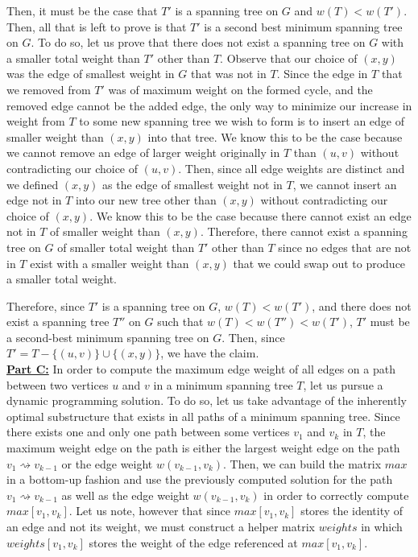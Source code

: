 \documentclass[11pt]{article}
\begin{document}
Then, it must be the case that $T'$ is a spanning tree on $G$ and $w(T) < w(T')$. Then, all that is left to prove is that $T'$ is a second best minimum spanning tree on $G$. To do so, let us prove that there does not exist a spanning tree on $G$ with a smaller total weight than $T'$ other than $T$. Observe that our choice of $(x,y)$ was the edge of smallest weight in $G$ that was not in $T$. Since the edge in $T$ that we removed from $T'$ was of maximum weight on the formed cycle, and the removed edge cannot be the added edge, the only way to minimize our increase in weight from $T$ to some new spanning tree we wish to form is to insert an edge of smaller weight than $(x,y)$ into that tree. We know this to be the case because we cannot remove an edge of larger weight originally in $T$ than $(u,v)$ without contradicting our choice of $(u,v)$. Then, since all edge weights are distinct and we defined $(x,y)$ as the edge of smallest weight not in $T$, we cannot insert an edge not in $T$ into our new tree other than $(x,y)$ without contradicting our choice of $(x,y)$. We know this to be the case because there cannot exist an edge not in $T$ of smaller weight than $(x,y)$. Therefore, there cannot exist a spanning tree on $G$ of smaller total weight than $T'$ other than $T$ since no edges that are not in $T$ exist with a smaller weight than $(x,y)$ that we could swap out to produce a smaller total weight.

Therefore, since $T'$ is a spanning tree on $G$, $w(T) < w(T')$, and there does not exist a spanning tree $T''$ on $G$ such that $w(T) < w(T'') < w(T')$, $T'$ must be a second-best minimum spanning tree on $G$. Then, since $T' = T - \{(u,v)\} \cup \{(x,y)\}$, we have the claim.\\

\underline{\textbf{Part C:}} In order to compute the maximum edge weight of all edges on a path between two vertices $u$ and $v$ in a minimum spanning tree $T$, let us pursue a dynamic programming solution. To do so, let us take advantage of the inherently optimal substructure that exists in all paths of a minimum spanning tree. Since there exists one and only one path between some vertices $v_1$ and $v_k$ in $T$, the maximum weight edge on the path is either the largest weight edge on the path $v_1 \rightsquigarrow v_{k-1}$ or the edge weight $w(v_{k-1},v_k)$. Then, we can build the matrix $max$ in a bottom-up fashion and use the previously computed solution for the path $v_1 \rightsquigarrow v_{k-1}$ as well as the edge weight $w(v_{k-1},v_k)$ in order to correctly compute $max[v_1,v_k]$. Let us note, however that since $max[v_1,v_k]$ stores the identity of an edge and not its weight, we must construct a helper matrix $weights$ in which $weights[v_1,v_k]$ stores the weight of the edge referenced at $max[v_1,v_k]$.
\end{document}
